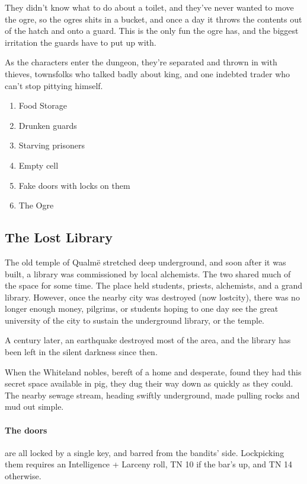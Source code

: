 \begin{multicols}{2}
\begin{boxtext}
\end{boxtext}

\noindent

They didn't know what to do about a toilet, and they've never wanted to move the ogre, so the ogres shits in a bucket, and once a day it throws the contents out of the hatch and onto a guard.
This is the only fun the ogre has, and the biggest irritation the guards have to put up with.

As the characters enter the dungeon, they're separated and thrown in with thieves, townsfolks who talked badly about \gls{king}, and one indebted trader who can't stop pittying himself.

\begin{enumerate}

	\item{Food Storage}
	\item{Drunken guards}
	\item{Starving prisoners}
	\item{Empty cell}
	\item{Fake doors with locks on them}
	\item{The Ogre}

\end{enumerate}




\subsection{The Lost Library}\label{sewers}\setcounter{list}{0}

The old temple of Qualm\"{e} stretched deep underground, and soon after it was built, a library was commissioned by local alchemists.
The two shared much of the space for some time.
The place held students, priests, alchemists, and a grand library.
However, once the nearby city was destroyed (now \gls{lostcity}), there was no longer enough money, pilgrims, or students hoping to one day see the great university of the city to sustain the underground library, or the temple.

A century later, an earthquake destroyed most of the area, and the library has been left in the silent darkness since then.

When the Whiteland nobles, bereft of a home and desperate, found they had this secret space available in \gls{pig}, they dug their way down as quickly as they could.  The nearby sewage stream, heading swiftly underground, made pulling rocks and mud out simple.

\paragraph{The doors} are all locked by a single key, and barred from the bandits' side.
Lockpicking them requires an Intelligence + Larceny roll, TN 10 if the bar's up, and TN 14 otherwise.

\end{multicols}

